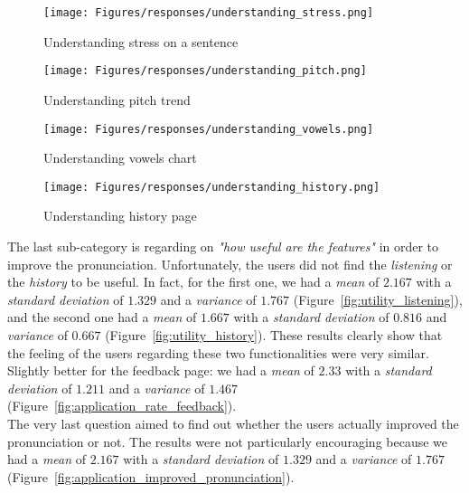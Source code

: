 \begin{figure}[!ht]
	\centering
	\begin{minipage}{.5\textwidth}
		\centering
		\texttt{[image: Figures/responses/understanding\_stress.png]}
		\caption{Understanding stress on a sentence}
		\label{fig:understanding_stress}
	\end{minipage}%
	\begin{minipage}{.5\textwidth}
		\centering
		\texttt{[image: Figures/responses/understanding\_pitch.png]}
		\caption{Understanding pitch trend}
		\label{fig:understanding_pitch}
	\end{minipage}
	\begin{minipage}{.5\textwidth}
		\centering
		\texttt{[image: Figures/responses/understanding\_vowels.png]}
		\caption{Understanding vowels chart}
		\label{fig:understanding_vowels}
	\end{minipage}%
	\begin{minipage}{.5\textwidth}
		\centering
		\texttt{[image: Figures/responses/understanding\_history.png]}
		\caption{Understanding history page}
		\label{fig:understanding_history}
	\end{minipage}%
\end{figure}

\noindent The last sub-category is regarding on \textit{"how useful are the features"} in order to improve the pronunciation. Unfortunately, the users did not find the \textit{listening} or the \textit{history} to be useful. In fact, for the first one, we had a \textit{mean} of $2.167$ with a \textit{standard deviation} of $1.329$ and a \textit{variance} of $1.767$ (Figure~\ref{fig:utility_listening}), and the second one had a \textit{mean} of $1.667$ with a \textit{standard deviation} of $0.816$ and \textit{variance} of $0.667$ (Figure~\ref{fig:utility_history}). These results clearly show that the feeling of the users regarding these two functionalities were very similar. Slightly better for the feedback page: we had a \textit{mean} of $2.33$ with a \textit{standard deviation} of $1.211$ and a \textit{variance} of $1.467$ (Figure~\ref{fig:application_rate_feedback}). \\
\noindent The very last question aimed to find out whether the users actually improved the pronunciation or not. The results were not particularly encouraging because we had a \textit{mean} of $2.167$ with a \textit{standard deviation} of $1.329$ and a \textit{variance} of $1.767$ (Figure~\ref{fig:application_improved_pronunciation}).

